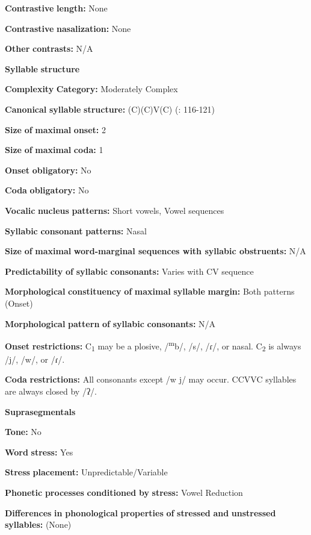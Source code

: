 \begin{styleBody}
\textbf{Contrastive} \textbf{length:} None

\textbf{Contrastive} \textbf{nasalization:} None

\textbf{Other} \textbf{contrasts:} N/A

\textbf{Syllable} \textbf{structure}

\textbf{Complexity} \textbf{Category:} Moderately Complex

\textbf{Canonical} \textbf{syllable} \textbf{structure:} (C)(C)V(C) (\citealt{SandersSanders1980}: 116-121)

\textbf{Size} \textbf{of} \textbf{maximal} \textbf{onset:} 2

\textbf{Size} \textbf{of} \textbf{maximal} \textbf{coda:} 1

\textbf{Onset} \textbf{obligatory:} No

\textbf{Coda} \textbf{obligatory:} No

\textbf{Vocalic} \textbf{nucleus} \textbf{patterns:} Short vowels, Vowel sequences

\textbf{Syllabic} \textbf{consonant} \textbf{patterns:} Nasal

\textbf{Size} \textbf{of} \textbf{maximal} \textbf{word{}-marginal sequences with syllabic obstruents:} N/A

\textbf{Predictability} \textbf{of} \textbf{syllabic} \textbf{consonants:} Varies with CV sequence

\textbf{Morphological} \textbf{constituency} \textbf{of} \textbf{maximal} \textbf{syllable} \textbf{margin:} Both patterns (Onset)

\textbf{Morphological} \textbf{pattern} \textbf{of} \textbf{syllabic} \textbf{consonants:} N/A

\textbf{Onset} \textbf{restrictions:} C\textsubscript{1} may be a plosive, /\textsuperscript{m}b/, /s/, /ɾ/, or nasal. C\textsubscript{2} is always /j/, /w/, or /ɾ/.

\textbf{Coda} \textbf{restrictions:} All consonants except /w j/ may occur. CCVVC syllables are always closed by /ʔ/.

\textbf{Suprasegmentals}

\textbf{Tone:} No

\textbf{Word} \textbf{stress:} Yes

\textbf{Stress} \textbf{placement:} Unpredictable/Variable

\textbf{Phonetic} \textbf{processes} \textbf{conditioned} \textbf{by} \textbf{stress:} Vowel Reduction

\textbf{Differences} \textbf{in} \textbf{phonological} \textbf{properties} \textbf{of} \textbf{stressed} \textbf{and} \textbf{unstressed} \textbf{syllables:} (None)


\end{styleBody}
